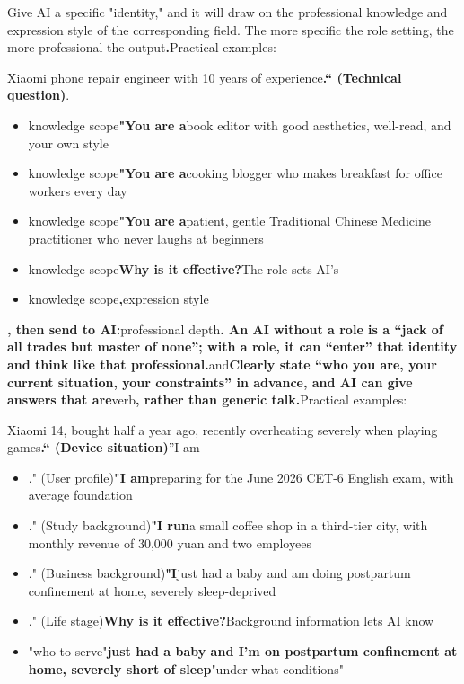 \begin{tcbinfo}{Give AI a specific "identity," and it will draw on the professional knowledge and expression style of the corresponding field.}
The more specific the role setting, the more professional the output\textbf{.}Practical examples:

\end{tcbinfo}


Xiaomi phone repair engineer with 10 years of experience\textbf{.“ (Technical question)}.


\begin{itemize}
  \item knowledge scope\textbf{"You are a}book editor with good aesthetics, well-read, and your own style
  \item knowledge scope\textbf{"You are a}cooking blogger who makes breakfast for office workers every day
  \item knowledge scope\textbf{"You are a}patient, gentle Traditional Chinese Medicine practitioner who never laughs at beginners
  \item knowledge scope\textbf{Why is it effective?}The role sets AI's
  \item knowledge scope\textbf{,}expression style
\end{itemize}

\textbf{, then send to AI:}professional depth\textbf{. An AI without a role is a “jack of all trades but master of none”; with a role, it can “enter” that identity and think like that professional.}and\textbf{Clearly state “who you are, your current situation, your constraints” in advance, and AI can give answers that are}verb\textbf{, rather than generic talk.}Practical examples:


Xiaomi 14, bought half a year ago, recently overheating severely when playing games\textbf{.“ (Device situation)}”I am


\begin{itemize}
  \item ." (User profile)\textbf{"I am}preparing for the June 2026 CET-6 English exam, with average foundation
  \item ." (Study background)\textbf{"I run}a small coffee shop in a third-tier city, with monthly revenue of 30,000 yuan and two employees
  \item ." (Business background)\textbf{"I}just had a baby and am doing postpartum confinement at home, severely sleep-deprived
  \item ." (Life stage)\textbf{Why is it effective?}Background information lets AI know
  \item "who to serve"\textbf{just had a baby and I'm on postpartum confinement at home, severely short of sleep}"under what conditions"
\end{itemize}

